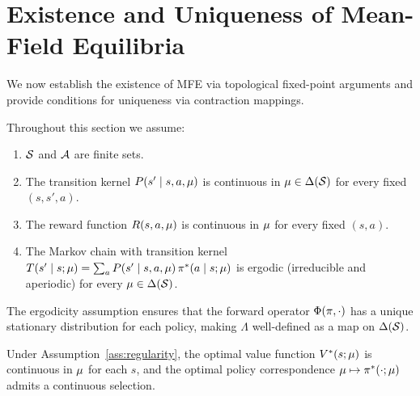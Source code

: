 \documentclass[11pt,a4paper]{article}
\begin{document}
\section{Existence and Uniqueness of Mean-Field Equilibria}
\label{sec:existence-uniqueness}

We now establish the existence of MFE via topological fixed-point
arguments and provide conditions for uniqueness via contraction
mappings.

\begin{assumption}
\label{ass:regularity}
Throughout this section we assume:
\begin{enumerate}[nosep]
  \item $\mathcal{S}$ and $\mathcal{A}$ are finite sets.
  \item The transition kernel $P(s' \mid s, a, \mu)$ is
    continuous in $\mu \in \Delta(\mathcal{S})$ for every
    fixed $(s, s', a)$.
  \item The reward function $R(s, a, \mu)$ is continuous
    in $\mu$ for every fixed $(s, a)$.
  \item The Markov chain with transition kernel
    $T(s' \mid s; \mu) = \sum_a P(s' \mid s, a, \mu)
    \, \pi^*(a \mid s; \mu)$ is ergodic (irreducible
    and aperiodic) for every $\mu \in \Delta(\mathcal{S})$.
\end{enumerate}
\end{assumption}

The ergodicity assumption ensures that the forward operator
$\Phi(\pi, \cdot)$ has a unique stationary distribution for
each policy, making $\Lambda$ well-defined as a map on
$\Delta(\mathcal{S})$.

\begin{lemma}
\label{lem:backward-continuity}
Under Assumption~\ref{ass:regularity}, the optimal value function
$V^*(s; \mu)$ is continuous in $\mu$ for each $s$,
and the optimal policy correspondence $\mu \mapsto
\pi^*(\cdot; \mu)$ admits a continuous selection.
\end{lemma}
\end{document}
